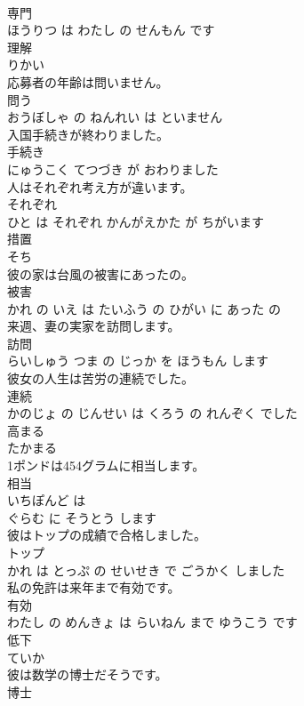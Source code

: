 \documentclass[8pt]{extreport}
\begin{document}
\begin{CJK}{UTF8}{min}
\\	専門 
\\	ほうりつ は わたし の せんもん です			
\\	理解	
\\	りかい			
\\	応募者の年齢は問いません。	
\\	問う 
\\	おうぼしゃ の ねんれい は といません			
\\	入国手続きが終わりました。	
\\	手続き 
\\	にゅうこく てつづき が おわりました			
\\	人はそれぞれ考え方が違います。	
\\	それぞれ 
\\	ひと は それぞれ かんがえかた が ちがいます			
\\	措置	
\\	そち			
\\	彼の家は台風の被害にあったの。	
\\	被害 
\\	かれ の いえ は たいふう の ひがい に あった の			
\\	来週、妻の実家を訪問します。	
\\	訪問 
\\	らいしゅう つま の じっか を ほうもん します			
\\	彼女の人生は苦労の連続でした。	
\\	連続 
\\	かのじょ の じんせい は くろう の れんぞく でした			
\\	高まる	
\\	たかまる			
\\	1ポンドは454グラムに相当します。	
\\	相当 
\\	いちぽんど は 
\\	ぐらむ に そうとう します			
\\	彼はトップの成績で合格しました。	
\\	トップ 
\\	かれ は とっぷ の せいせき で ごうかく しました			
\\	私の免許は来年まで有効です。	
\\	有効 
\\	わたし の めんきょ は らいねん まで ゆうこう です			
\\	低下	
\\	ていか			
\\	彼は数学の博士だそうです。	
\\	博士 

\end{CJK}
\end{document}
